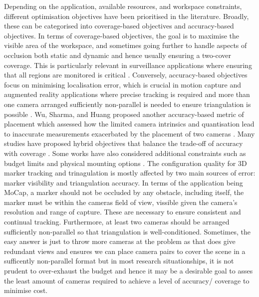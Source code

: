 Depending on the application, available resources, and workspace constraints, different optimisation objectives have been prioritised in the literature. Broadly, these can be categorised into coverage-based objectives and accuracy-based objectives. In terms of coverage-based objectives, the goal is to maximise the visible area of the workspace, and sometimes going further to handle aspects of occlusion both static and dynamic and hence usually ensuring a two-cover coverage. This is particularly relevant in surveillance applications where ensuring that all regions are monitored is critical \parencite{bodorOptimalCameraPlacement2007}. Conversely, accuracy-based objectives focus on minimising localisation error, which is crucial in motion capture and augmented reality applications where precise tracking is required and more than one camera arranged sufficiently non-parallel is needed to ensure triangulation is possible \parencite{aissaouiDesigningCameraPlacement2018, rahimianOptimalCameraPlacement2017}. Wu, Sharma, and Huang proposed another accuracy-based metric of placement which assessed how the limited camera intrinsics and quantisation lead to inaccurate measurements exacerbated by the placement of two cameras \parencite{sharmaAnalysisUncertaintyBounds1998}. Many studies have proposed hybrid objectives that balance the trade-off of accuracy with coverage \parencite{zieglerOptimalCameraPlacement2023, zhouSensorPlacementOptimization2024}. Some works have also considered additional constraints such as budget limits and physical mounting options \parencite{aissaouiDesigningCameraPlacement2018, puligandlaMultiresolutionApproachLarge2022, daiOptimalCameraConfiguration}.
The configuration quality for 3D marker tracking and trinagulation is mostly affected by two main sources of error: marker visibility and triangulation accuracy. In terms of the application being \gls{MoCap}, a marker should not be occluded by any obstacle, including itself, the marker must be within the cameras field of view, vissible given the camera's resolution and range of capture. These are necessary to ensure consistent and continual tracking. Furthermore, at least two cameras should be arranged sufficiently non-parallel so that triangulation is well-conditioned. Sometimes, the easy answer is just to throw more cameras at the problem as that does give redundant views and ensures we can place camera pairs to cover the scene in a sufficently non-parallel format but in most research situationships, it is not prudent to over-exhaust the budget and hence it may be a desirable goal to asses the least amount of cameras required to achieve a level of accuracy/ coverage to minimise cost.  


